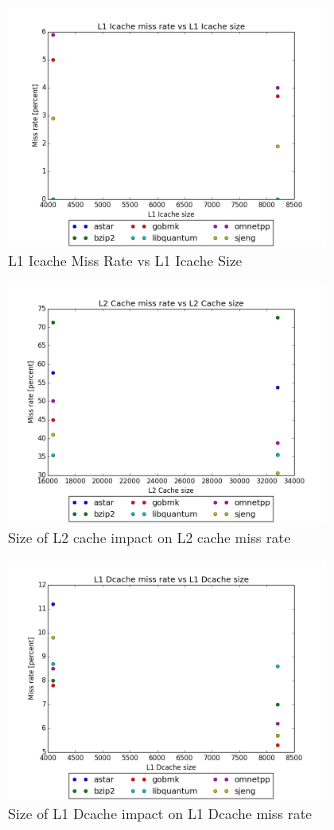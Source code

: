 \documentclass{article}
\begin{document}
\begin{figure}[ht]
    \centering
    \includegraphics[width=0.75\textwidth]{plots/L1icache_miss_vs_L1icache_size.png}
    \caption{L1 Icache Miss Rate vs L1 Icache Size}
    \label{fig:L1imissvsl1isize}
\end{figure}

\begin{figure}[ht]
    \centering
    \includegraphics[width=0.75\textwidth]{plots/L2cache_miss_vs_size.png}
    \caption{Size of L2 cache impact on L2 cache miss rate}
    \label{fig:l2vsmiss}
\end{figure}

\begin{figure}[ht]
    \centering
    \includegraphics[width=0.75\textwidth]{plots/L1_Dcache_miss_vs_L1_Dcache_size.png}
    \caption{Size of L1 Dcache impact on L1 Dcache miss rate}
    \label{fig:l1vsmiss}
\end{figure}
\end{document}
